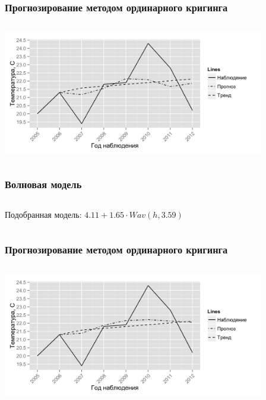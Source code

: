 \documentclass[10pt, pdf,aspectratio=169]{beamer}
\begin{document}
\begin{frame}
  \frametitle{Прогнозирование методом ординарного кригинга}   %
   \begin{columns}[c]
   \column{4.5in}
   \includegraphics[width=4.5in]{../../figures/variogram/auto-class-18-cross-prediction.png}
  \end{columns}
\end{frame}

\begin{frame}
  \frametitle{Волновая модель}   %
  \begin{columns}[c]
  \column{2in}  %
  Подобранная модель: $ 4.11 + 1.65 \cdot Wav(h, 3.59) $
  \column{3in}
  \end{columns}
\end{frame}

\begin{frame}
  \frametitle{Прогнозирование методом ординарного кригинга}   %
   \begin{columns}[c]
   \column{4.5in}
   \includegraphics[width=4.5in]{../../figures/variogram/auto-rob-5-cross-prediction.png}
  \end{columns}
\end{frame}

\end{document}
